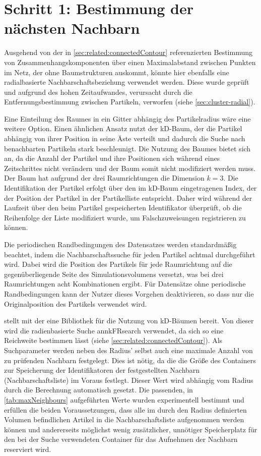 \section{Schritt 1: Bestimmung der nächsten Nachbarn}\label{sec:nachbarschaftssuche}

Ausgehend von der in \autoref{sec:related:connectedContour} referenzierten Bestimmung von Zusammenhangskomponenten über einen Maximalabstand zwischen Punkten im Netz, der ohne Baumstrukturen auskommt, könnte hier ebenfalls eine radialbasierte Nachbarschaftsbeziehung verwendet werden. Diese wurde geprüft und aufgrund des hohen Zeitaufwandes, verursacht durch die Entfernungsbestimmung zwischen Partikeln, verworfen (siehe \autoref{sec:cluster-radial}).

Eine Einteilung des Raumes in ein Gitter abhängig des Partikelradius wäre eine weitere Option. Einen ähnlichen Ansatz nutzt der kD-Baum, der die Partikel abhängig von ihrer Position in seine Äste verteilt und dadurch die Suche nach benachbarten Partikeln stark beschleunigt. Die Nutzung des Baumes bietet sich an, da die Anzahl der Partikel und ihre Positionen sich während eines Zeitschrittes nicht verändern und der Baum somit nicht modifiziert werden muss. Der Baum hat aufgrund der drei Raumrichtungen die Dimension $k=3$. Die Identifikation der Partikel erfolgt über den im kD-Baum eingetragenen Index, der der Position der Partikel in der Partikelliste entspricht. Daher wird während der Laufzeit über den beim Partikel gespeicherten Identifikator überprüft, ob die Reihenfolge der Liste modifiziert wurde, um Falschzuweisungen registrieren zu können.

Die periodischen Randbedingungen des Datensatzes werden standardmäßig beachtet, indem die Nachbarschaftssuche für jeden Partikel achtmal durchgeführt wird. Dabei wird die Position des Partikels für jede Raumrichtung auf die gegenüberliegende Seite des Simulationsvolumens versetzt, was bei drei Raumrichtungen acht Kombinationen ergibt.
Für Datensätze ohne periodische Randbedingungen kann der Nutzer dieses Vorgehen deaktivieren, so dass nur die Originalposition des Partikels verwendet wird.

 stellt mit der \ANN eine Bibliothek für die Nutzung von kD-Bäumen bereit. Von dieser wird die radienbasierte Suche annkFRsearch verwendet, da sich so eine Reichweite bestimmen lässt (siehe \autoref{sec:related:connectedContour}). Als Suchparameter werden neben des Radius' selbst auch eine maximale Anzahl von zu prüfenden Nachbarn festgelegt. Dies ist nötig, da die \ANN die Größe des Containers zur Speicherung der Identifikatoren der festgestellten Nachbarn (Nachbarschaftsliste) im Voraus festlegt. Dieser Wert wird abhängig vom Radius durch die Berechnung automatisch gesetzt. Die passenden, in \autoref{tab:maxNeighbours} aufgeführten Werte wurden experimentell bestimmt und erfüllen die beiden Voraussetzungen, dass alle im durch den Radius definierten Volumen befindlichen Artikel in die Nachbarschaftsliste aufgenommen werden können und andererseits möglichst wenig zusätzlicher, unnötiger Speicherplatz für den bei der Suche verwendeten Container für das Aufnehmen der Nachbarn reserviert wird. 

